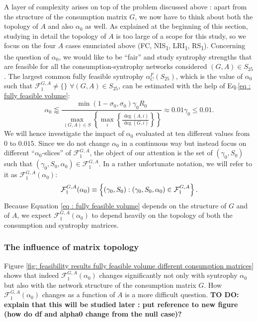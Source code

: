 \documentclass[12pt, titlepage]{report}
\begin{document}
A layer of complexity arises on top of the problem discussed above%
: apart from the structure of the consumption matrix $G$, we now have to think about both the topology of $A$ and also $\alpha_0$ as well. As explained at the beginning of this section, studying in detail the topology of $A$ is too large of a scope for this study, so we focus on the four $A$ cases enunciated above (FC, NIS\textsubscript{1}, LRI\textsubscript{1}, RS\textsubscript{1}). Concerning the question of $\alpha_0$, we would like to be ``fair'' and study syntrophy strengths that are feasible for all the consumption-syntrophy networks considered $(G,A) \in S_{25}$.
  The largest common fully feasible syntrophy $\alpha_C^F(S_{25})$, which is the value of $\alpha_0$ such that $\mathcal{F}^{G,A}_1 \neq \{\}$ $\forall (G,A) \in S_{25}$, can be estimated with the help of Eq.\eqref{eq : fully feasible volume}:
  \begin{equation}
  \alpha_0 \lessapprox \frac{\min(1-\sigma_0, \sigma_0)\gamma_0 R_0}{\max_{(G,A)\in S}\left\{\max_i\left\{\frac{\deg(A,i)}{\deg(G,i)}\right\}\right\}} \approx 0.01 \gamma_0 \leq 0.01. \label{eq : results feasibility largest alpha0}
  \end{equation}
  We will hence investigate the impact of $\alpha_0$ evaluated at ten different values from $0$ to $0.015$. %
  Since we do not change $\alpha_0$ in a continuous way but instead focus on different ``$\alpha_0$-slices'' of $\mathcal{F}^{G,A}_1$, the object of our attention is the set of $(\gamma_0, S_0)$ such that $(\gamma_0, S_0, \alpha_0) \in \mathcal{F}^{G,A}_1$. In a rather unfortunate notation, we will refer to it as $\mathcal{F}^{G,A}_1(\alpha_0)$:
  \begin{equation}
  \mathcal{F}^{G,A}_1(\alpha_0) \equiv \left\{(\gamma_0, S_0) : (\gamma_0, S_0, \alpha_0) \in \mathcal{F}^{G,A}_1 \right\}.
  \end{equation}
  Because Equation \eqref{eq : fully feasible volume} depends on the structure of $G$ and of $A$, we expect $\mathcal{F}^{G,A}_1(\alpha_0)$ to depend heavily on the topology of both the consumption and syntrophy matrices.

  \subsubsection{The influence of matrix topology}\label{sec : feasibility results influence of matrix topology}
  Figure \ref{fig: feasibility results fully feasible volume different consumption matrices} shows that indeed $\mathcal{F}^{G,A}_1(\alpha_0)$ changes significantly not only with syntrophy $\alpha_0$ but also with the network structure of the consumption matrix $G$. How $\mathcal{F}^{G,A}_1(\alpha_0)$ changes as a function of $A$ is a more difficult question. \textbf{TO DO: explain that this will be studied later : put reference to new figure (how do df and alpha0 change from the null case)?}
\end{document}
